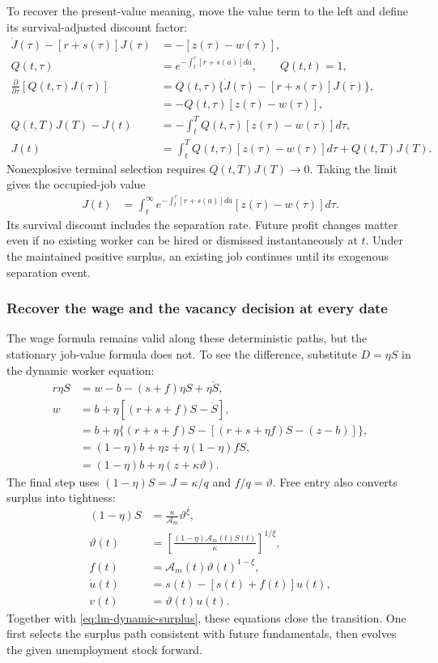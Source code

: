 To recover the present-value meaning, move the value term to the left and
define its survival-adjusted discount factor:
\begin{align}
 \dot J(\tau)-[r+s(\tau)]J(\tau)&=-[z(\tau)-w(\tau)],\\
 Q(t,\tau)&=e^{-\int_t^\tau[r+s(a)]da},\qquad Q(t,t)=1,\\
 \frac{\partial}{\partial\tau}[Q(t,\tau)J(\tau)]
 &=Q(t,\tau)\{\dot J(\tau)-[r+s(\tau)]J(\tau)\},\\
 &=-Q(t,\tau)[z(\tau)-w(\tau)],\\
 Q(t,T)J(T)-J(t)
 &=-\int_t^T Q(t,\tau)[z(\tau)-w(\tau)]d\tau,\\
 J(t)&=\int_t^T Q(t,\tau)[z(\tau)-w(\tau)]d\tau+Q(t,T)J(T).
\end{align}
Nonexplosive terminal selection requires $Q(t,T)J(T)\to0$. Taking the limit
gives the occupied-job value
\begin{align}
 J(t)&=\int_t^\infty
 e^{-\int_t^\tau[r+s(a)]da}[z(\tau)-w(\tau)]d\tau.
\end{align}
Its survival discount includes the separation rate. Future profit changes
matter even if no existing worker can be hired or dismissed instantaneously
at $t$. Under the maintained positive surplus, an existing job continues until
its exogenous separation event.

\subsubsection{Recover the wage and the vacancy decision at every date}

The wage formula remains valid along these deterministic paths, but the
stationary job-value formula does not. To see the difference, substitute
$D=\eta S$ in the dynamic worker equation:
\begin{align}
 r\eta S&=w-b-(s+f)\eta S+\eta\dot S,\\
 w&=b+\eta[(r+s+f)S-\dot S],\\
  &=b+\eta\{(r+s+f)S-[(r+s+\eta f)S-(z-b)]\},\\
  &=(1-\eta)b+\eta z+\eta(1-\eta)fS,\\
  &=(1-\eta)b+\eta(z+\kappa\vartheta).
\end{align}
The final step uses $(1-\eta)S=J=\kappa/q$ and $f/q=\vartheta$.
Free entry also converts surplus into tightness:
\begin{align}
 (1-\eta)S&=\frac\kappa{\mathcal A_m}\vartheta^\xi,\\
 \vartheta(t)&=\left[\frac{(1-\eta)\mathcal A_m(t)S(t)}\kappa\right]^{1/\xi},\\
 f(t)&=\mathcal A_m(t)\vartheta(t)^{1-\xi},\\
 \dot u(t)&=s(t)-[s(t)+f(t)]u(t),\\
 v(t)&=\vartheta(t)u(t).
 \label{eq:lm-transition-closure}
\end{align}
Together with \eqref{eq:lm-dynamic-surplus}, these equations close the
transition. One first selects the surplus path consistent with future
fundamentals, then evolves the given unemployment stock forward.

